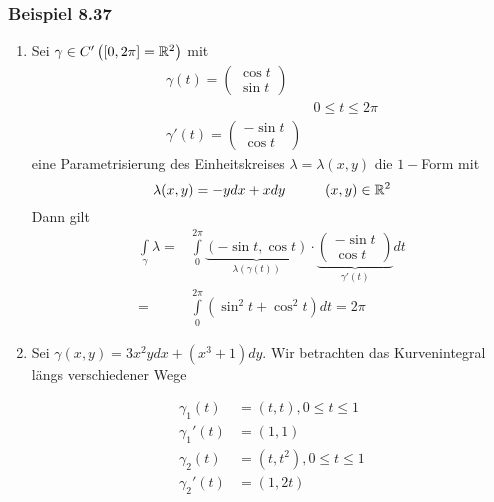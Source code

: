 \subsubsection*{Beispiel 8.37}
\begin{enumerate}
\item Sei $\gamma\in C'\left(\lbrack 0,2\pi\rbrack =\mathbb{R}^2\right)$ mit
\[\begin{array}{*{20}{c}}
{\gamma (t) = \left( {\begin{array}{*{20}{c}}
{\cos t}\\
{\sin t}
\end{array}} \right)}&{}\\
{}&{0 \le t \le 2\pi }\\
{\gamma '(t) = \left( {\begin{array}{*{20}{c}}
{ - \sin t}\\
{\cos t}
\end{array}} \right)}&{}
\end{array}\]
eine Parametrisierung des Einheitskreises $\lambda = \lambda (x,y)$ die $1-$Form mit \[\lambda (x,y)=-ydx+xdy\hspace{10mm}(x,y)\in\R^2\]
Dann gilt
\begin{align*}
\int\limits_\gamma  \lambda   = &\int\limits_0^{2\pi } {\underbrace {\left( { - \sin t,\cos t} \right)}_{\lambda (\gamma (t))} \cdot \underbrace {\left( {\begin{array}{*{20}{c}}
{ - \sin t}\\
{\cos t}
\end{array}} \right)}_{\gamma '(t)}dt} \\
= &\int\limits_0^{2\pi } {\left( {{{\sin }^2}t + {{\cos }^2}t} \right)dt}  = 2\pi
\end{align*}
\item Sei $\gamma (x,y)=3x^2ydx + \left( x^3+1\right)dy$. Wir betrachten das Kurvenintegral längs verschiedener Wege
\begin{multicols}{2}
\begin{align*}
\gamma_1(t)&=(t,t), 0\leq t\leq 1\\
\gamma_1'(t)&=(1,1)\\
\gamma_2(t)&=(t,t^2), 0\leq t\leq 1\\
\gamma_2'(t)&=(1,2t)\\
\end{align*}
\null\vfill
\columnbreak
\begin{center}
\end{center}
\end{multicols}
\end{enumerate}
